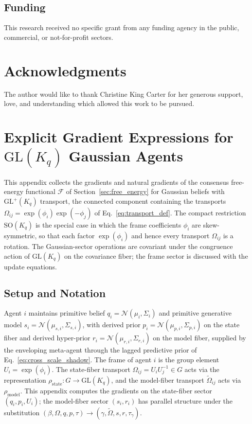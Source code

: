 \documentclass[11pt]{article}
\newenvironment{acknowledgments}
  {\section*{Acknowledgments}}
  {}
\begin{document}
\subsection*{Funding}
This research received no specific grant from any funding agency in the public, commercial, or not-for-profit sectors.

\begin{acknowledgments}
The author would like to thank Christine King Carter for her generous support, love, and understanding which allowed this work to be pursued.
\end{acknowledgments}

\appendix

\section{\texorpdfstring{Explicit Gradient Expressions for $\mathrm{GL}(K_q)$ Gaussian Agents}{Explicit Gradient Expressions for GL(Kq) Gaussian Agents}}\label{app:gradients}

This appendix collects the gradients and natural gradients of the consensus free-energy functional $\mathcal{F}$ of Section~\ref{sec:free_energy} for Gaussian beliefs with $\mathrm{GL}^+(K_q)$ transport, the connected component containing the transports $\Omega_{ij} = \exp(\phi_i)\exp(-\phi_j)$ of Eq.~\eqref{eq:transport_def}. The compact restriction $\mathrm{SO}(K_q)$ is the special case in which the frame coefficients $\phi_i$ are skew-symmetric, so that each factor $\exp(\phi_i)$ and hence every transport $\Omega_{ij}$ is a rotation. The Gaussian-sector operations are covariant under the congruence action of $\mathrm{GL}(K_q)$ on the covariance fiber; the frame sector is discussed with the update equations.

\subsection*{Setup and Notation}

Agent $i$ maintains primitive belief $q_i = \mathcal{N}(\mu_i, \Sigma_i)$ and primitive generative model $s_i = \mathcal{N}(\mu_{s,i}, \Sigma_{s,i})$, with derived prior $p_i = \mathcal{N}(\mu_{p,i}, \Sigma_{p,i})$ on the state fiber and derived hyper-prior $r_i = \mathcal{N}(\mu_{r,i}, \Sigma_{r,i})$ on the model fiber, supplied by the enveloping meta-agent through the lagged predictive prior of Eq.~\eqref{eq:cross_scale_shadow}. The frame of agent $i$ is the group element $U_i = \exp(\phi_i)$. The state-fiber transport $\Omega_{ij} = U_iU_j^{-1} \in G$ acts via the representation $\rho_{\mathrm{state}}: G \to \mathrm{GL}(K_q)$, and the model-fiber transport $\tilde\Omega_{ij}$ acts via $\rho_{\mathrm{model}}$. This appendix computes the gradients on the state-fiber sector $(q_i, p_i, U_i)$; the model-fiber sector $(s_i, r_i)$ has parallel structure under the substitution $(\beta, \Omega, q, p, \tau) \to (\gamma, \tilde\Omega, s, r, \tau_\gamma)$.
\end{document}
